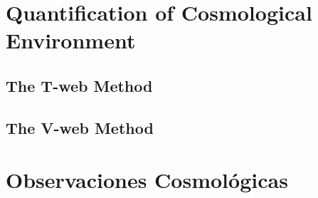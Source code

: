 \section{Quantification of Cosmological Environment}
\label{sec:QuantificationOfCosmologicalEnvironment}


	\subsection{The T-web Method}
	\label{subsec:TheT-webMethod}


	\subsection{The V-web Method}
	\label{subsec:TheV-webMethod}






\section{Observaciones Cosmológicas}
\label{sec:CosmologicalObservations}
	


